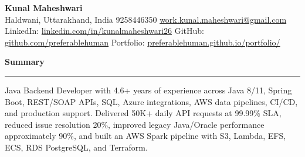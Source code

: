 \documentclass[10pt,letterpaper]{article}
\newcommand{\ressection}[1]{\vspace{2.3pt}\par\textbf{#1}\par\vspace{0.7pt}\hrule\vspace{1.3pt}}
\begin{document}
\pagestyle{empty}\raggedright\fontsize{9.82}{10.50}\selectfont

{\Large \textbf{Kunal Maheshwari}}\\
Haldwani, Uttarakhand, India \textbar{} 9258446350 \textbar{} \href{mailto:work.kunal.maheshwari@gmail.com}{work.kunal.maheshwari@gmail.com}\\
LinkedIn: \href{https://www.linkedin.com/in/kunalmaheshwari26}{linkedin.com/in/kunalmaheshwari26} \textbar{} GitHub: \href{https://github.com/preferablehuman}{github.com/preferablehuman} \textbar{} Portfolio: \href{https://preferablehuman.github.io/portfolio/}{preferablehuman.github.io/portfolio/}

\ressection{Summary}
Java Backend Developer with 4.6+ years of experience across Java 8/11, Spring Boot, REST/SOAP APIs, SQL, Azure integrations, AWS data pipelines, CI/CD, and production support. Delivered 50K+ daily API requests at 99.99\% SLA, reduced issue resolution 20\%, improved legacy Java/Oracle performance approximately 90\%, and built an AWS Spark pipeline with S3, Lambda, EFS, ECS, RDS PostgreSQL, and Terraform.
\end{document}
